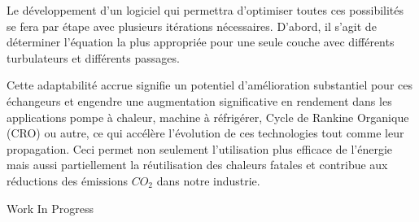 {Le développement d'un logiciel qui permettra d'optimiser toutes ces possibilités se fera par étape avec plusieurs itérations nécessaires. D'abord, il s'agit de déterminer l'équation la plus appropriée pour une seule couche avec différents turbulateurs et différents passages. 



Cette adaptabilité accrue signifie un potentiel d'amélioration substantiel pour ces échangeurs et engendre une augmentation significative en rendement dans les applications pompe à chaleur, machine à réfrigérer, Cycle de Rankine Organique (CRO) ou autre,  ce qui accélère l'évolution de ces technologies tout comme leur propagation.  Ceci permet non seulement l'utilisation plus efficace de l'énergie mais aussi partiellement la réutilisation des chaleurs fatales  et contribue aux réductions des émissions $\unit{CO_2}$ dans notre industrie.

 \vfill Work In Progress

}
 
